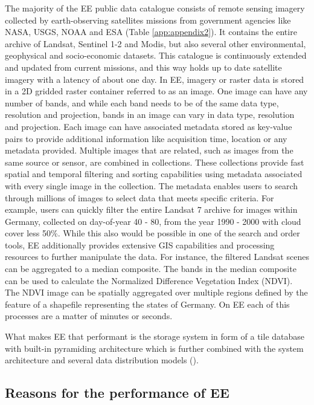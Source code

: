 The majority of the EE public data catalogue consists of remote sensing imagery collected by earth-observing satellites missions from government agencies like NASA, USGS, NOAA and ESA (Table \ref{app:appendix2}). It contains the entire archive of Landsat, Sentinel 1-2 and Modis, but also several other environmental, geophysical and socio-economic datasets. This catalogue is continuously extended and updated from current missions, and this way holds up to date satellite imagery with a latency of about one day.
In EE, imagery or raster data is stored in a 2D gridded raster container referred to as an image. One image can have any number of bands, and while each band needs to be of the same data type, resolution and projection, bands in an image can vary in data type, resolution and projection. Each image can have associated metadata stored as key-value pairs to provide additional information like acquisition time, location or any metadata provided.
Multiple images that are related, such as images from the same source or sensor, are combined in collections. These collections provide fast spatial and temporal filtering and sorting capabilities using metadata associated with every single image in the collection. The metadata enables users to search through millions of images to select data that meets specific criteria. For example, users can quickly filter the entire Landsat 7 archive for images within Germany, collected on day-of-year 40 - 80, from the year 1990 - 2000 with cloud cover less 50\%. While this also would be possible in one of the search and order tools, EE additionally provides extensive GIS capabilities and processing resources to further manipulate the data.
For instance, the filtered Landsat scenes can be aggregated to a median composite. The bands in the median composite can be used to calculate the Normalized Difference Vegetation Index (NDVI). The NDVI image can be spatially aggregated over multiple regions defined by the feature of a shapefile representing the states of Germany. On EE each of this processes are a matter of minutes or seconds.

What makes EE that performant is the storage system in form of a tile database with built-in pyramiding architecture which is further combined with the system architecture and several data distribution models (\cite{gorelick2017google}).

\subsection{Reasons for the performance of EE}

